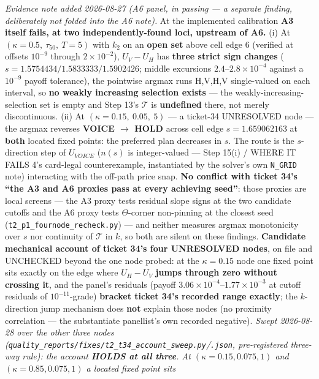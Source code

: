 \documentclass[11pt,a4paper]{article}
\newcommand{\Tmap}{\mathcal{T}}
\begin{document}
\begin{description}[leftmargin=1.9em,style=unboxed]
  \emph{Evidence note added 2026-08-27 (A6 panel, in passing --- a separate finding,
  deliberately not folded into the A6 note).} At the implemented calibration \textbf{A3
  itself fails, at two independently-found loci, upstream of A6.} (i) At
  $(\kappa{=}0.5,\ \tau_{50},\ T{=}5)$ with $k_2$ on an \textbf{open set} above cell edge
  6 (verified at offsets $10^{-9}$ through $2\times10^{-2}$), $U_V-U_H$ has \textbf{three
  strict sign changes} ($s = 1.5754434 / 1.5833333 / 1.5902426$; middle excursions
  $2.4$--$2.8\times10^{-4}$ against a $10^{-9}$ payoff tolerance), the pointwise argmax
  runs H,V,H,V single-valued on each interval, so \textbf{no weakly increasing selection
  exists} --- the weakly-increasing-selection set is empty and Step 13's $\Tmap$ is
  \textbf{undefined} there, not merely discontinuous. (ii) At $(\kappa{=}0.15,\ 0.05,\ 5)$ --- a ticket-34
  UNRESOLVED node --- the argmax reverses \textbf{VOICE $\to$ HOLD} across cell edge
  $s = 1.659062163$ at \textbf{both} located fixed points: the preferred plan decreases in
  $s$. The route is the $s$-direction step of $U_{VOICE}$ ($n(s)$ is integer-valued ---
  Step 15(i) / WHERE IT FAILS 4's card-legal counterexample, instantiated by the solver's
  own \texttt{N\_GRID} note) interacting with the off-path price snap. \textbf{No conflict
  with ticket 34's ``the A3 and A6 proxies pass at every achieving seed''}: those proxies
  are local screens --- the A3 proxy tests residual slope signs at the two candidate
  cutoffs and the A6 proxy tests $\Theta$-corner non-pinning at the closest seed
  (\texttt{t2\_p1\_fournode\_recheck.py}) --- and neither measures argmax monotonicity
  over $s$ nor continuity of $\Tmap$ in $k$, so both are silent on these findings.
  \textbf{Candidate mechanical account of ticket 34's four UNRESOLVED nodes}, on file and
  UNCHECKED beyond the one node probed: at the $\kappa=0.15$ node one fixed point sits
  exactly on the edge where $U_H-U_V$ \textbf{jumps through zero without crossing it}, and
  the panel's residuals (payoff $3.06\times10^{-4}$--$1.77\times10^{-3}$ at cutoff
  residuals of $10^{-11}$-grade) \textbf{bracket ticket 34's recorded range exactly}; the
  $k$-direction jump mechanism does \textbf{not} explain those nodes (no proximity
  correlation --- the substantiate panellist's own recorded negative). \emph{Swept
  2026-08-28 over the other three nodes
  (\texttt{quality\_reports/\allowbreak fixes/\allowbreak t2\_t34\_account\_sweep.py}/\texttt{.json},
  pre-registered three-way rule): the account \textbf{HOLDS at all three}. At
  $(\kappa{=}0.15, 0.075, 1)$ and $(\kappa{=}0.85, 0.075, 1)$ a located fixed point sits
}
\end{description}
\end{document}
